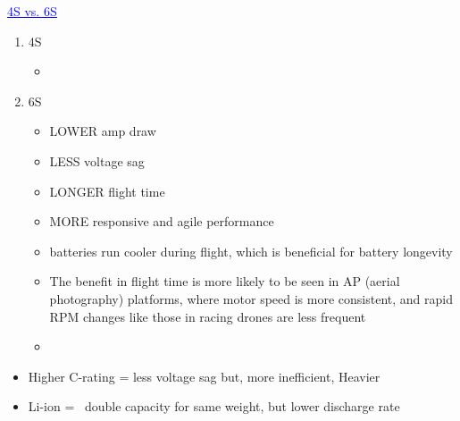 	\href{https://oscarliang.com/6s-mini-quad-racing-drone/#:~:text=A%206S%20LiPo%20battery%20has,LOWER%20amp%20draw}{\textcolor{blue}{\underline{4S vs. 6S}}}
	\begin{enumerate}
		\item 4S
			\begin{itemize}
				\item 
			\end{itemize}
		\item 6S
			\begin{itemize}
				\item LOWER amp draw
				\item LESS voltage sag
				\item LONGER flight time
				\item MORE responsive and agile performance
				\item batteries run cooler during flight, which is beneficial for battery longevity
				\item The benefit in flight time is more likely to be seen in AP (aerial photography) platforms, where motor speed is more consistent, and rapid RPM changes like those in racing drones are less frequent
				\item 
			\end{itemize}
	\end{enumerate}

	\begin{itemize}
		\item Higher C-rating = less voltage sag but, more inefficient, Heavier
		\item Li-ion = ~double capacity for same weight, but lower discharge rate
	\end{itemize}

